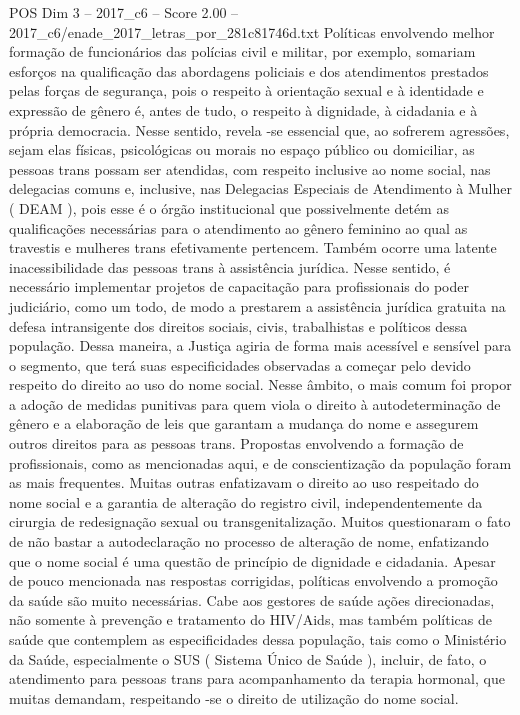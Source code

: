 \begin{textsample}{POS Dim 3 – 2017\_c6 – Score 2.00 – 2017\_c6/enade\_2017\_letras\_por\_281c81746d.txt}
Políticas envolvendo melhor formação de funcionários das polícias civil e militar, por exemplo, somariam esforços na qualificação das abordagens policiais e dos atendimentos prestados pelas forças de segurança, pois o respeito à orientação sexual e à identidade e expressão de gênero é, antes de tudo, o respeito à dignidade, à cidadania e à própria democracia.
Nesse sentido, revela -se essencial que, ao sofrerem agressões, sejam elas físicas, psicológicas ou morais no espaço público ou domiciliar, as pessoas trans possam ser atendidas, com respeito inclusive ao nome social, nas delegacias comuns e, inclusive, nas Delegacias Especiais de Atendimento à Mulher ( DEAM ), pois esse é o órgão institucional que possivelmente detém as qualificações necessárias para o atendimento ao gênero feminino ao qual as travestis e mulheres trans efetivamente pertencem.
Também ocorre uma latente inacessibilidade das pessoas trans à assistência jurídica.
Nesse sentido, é necessário implementar projetos de capacitação para profissionais do poder judiciário, como um todo, de modo a prestarem a assistência jurídica gratuita na defesa intransigente dos direitos sociais, civis, trabalhistas e políticos dessa população.
Dessa maneira, a Justiça agiria de forma mais acessível e sensível para o segmento, que terá suas especificidades observadas a começar pelo devido respeito do direito ao uso do nome social.
Nesse âmbito, o mais comum foi propor a adoção de medidas punitivas para quem viola o direito à autodeterminação de gênero e a elaboração de leis que garantam a mudança do nome e assegurem outros direitos para as pessoas trans.
Propostas envolvendo a formação de profissionais, como as mencionadas aqui, e de conscientização da população foram as mais frequentes.
Muitas outras enfatizavam o direito ao uso respeitado do nome social e a garantia de alteração do registro civil, independentemente da cirurgia de redesignação sexual ou transgenitalização.
Muitos questionaram o fato de não bastar a autodeclaração no processo de alteração de nome, enfatizando que o nome social é uma questão de princípio de dignidade e cidadania.
Apesar de pouco mencionada nas respostas corrigidas, políticas envolvendo a promoção da saúde são muito necessárias.
Cabe aos gestores de saúde ações direcionadas, não somente à prevenção e tratamento do HIV/Aids, mas também políticas de saúde que contemplem as especificidades dessa população, tais como o Ministério da Saúde, especialmente o SUS ( Sistema Único de Saúde ), incluir, de fato, o atendimento para pessoas trans para acompanhamento da terapia hormonal, que muitas demandam, respeitando -se o direito de utilização do nome social.

\end{textsample}
